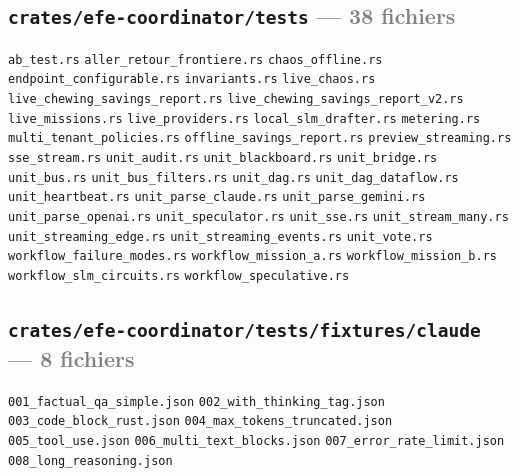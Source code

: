 \documentclass[10pt]{report}
\newcommand{\code}[1]{\texttt{\small #1}}
\begin{document}
\subsection*{\code{crates/efe-coordinator/tests} \normalfont\textcolor{grey}{--- 38 fichiers}}
\begin{sloppypar}\footnotesize\raggedright
\code{ab\_test.rs} \;\textbullet\; \code{aller\_retour\_frontiere.rs} \;\textbullet\; \code{chaos\_offline.rs} \;\textbullet\; \code{endpoint\_configurable.rs} \;\textbullet\; \code{invariants.rs} \;\textbullet\; \code{live\_chaos.rs} \;\textbullet\; \code{live\_chewing\_savings\_report.rs} \;\textbullet\; \code{live\_chewing\_savings\_report\_v2.rs} \;\textbullet\; \code{live\_missions.rs} \;\textbullet\; \code{live\_providers.rs} \;\textbullet\; \code{local\_slm\_drafter.rs} \;\textbullet\; \code{metering.rs} \;\textbullet\; \code{multi\_tenant\_policies.rs} \;\textbullet\; \code{offline\_savings\_report.rs} \;\textbullet\; \code{preview\_streaming.rs} \;\textbullet\; \code{sse\_stream.rs} \;\textbullet\; \code{unit\_audit.rs} \;\textbullet\; \code{unit\_blackboard.rs} \;\textbullet\; \code{unit\_bridge.rs} \;\textbullet\; \code{unit\_bus.rs} \;\textbullet\; \code{unit\_bus\_filters.rs} \;\textbullet\; \code{unit\_dag.rs} \;\textbullet\; \code{unit\_dag\_dataflow.rs} \;\textbullet\; \code{unit\_heartbeat.rs} \;\textbullet\; \code{unit\_parse\_claude.rs} \;\textbullet\; \code{unit\_parse\_gemini.rs} \;\textbullet\; \code{unit\_parse\_openai.rs} \;\textbullet\; \code{unit\_speculator.rs} \;\textbullet\; \code{unit\_sse.rs} \;\textbullet\; \code{unit\_stream\_many.rs} \;\textbullet\; \code{unit\_streaming\_edge.rs} \;\textbullet\; \code{unit\_streaming\_events.rs} \;\textbullet\; \code{unit\_vote.rs} \;\textbullet\; \code{workflow\_failure\_modes.rs} \;\textbullet\; \code{workflow\_mission\_a.rs} \;\textbullet\; \code{workflow\_mission\_b.rs} \;\textbullet\; \code{workflow\_slm\_circuits.rs} \;\textbullet\; \code{workflow\_speculative.rs}
\end{sloppypar}

\subsection*{\code{crates/efe-coordinator/tests/fixtures/claude} \normalfont\textcolor{grey}{--- 8 fichiers}}
\begin{sloppypar}\footnotesize\raggedright
\code{001\_factual\_qa\_simple.json} \;\textbullet\; \code{002\_with\_thinking\_tag.json} \;\textbullet\; \code{003\_code\_block\_rust.json} \;\textbullet\; \code{004\_max\_tokens\_truncated.json} \;\textbullet\; \code{005\_tool\_use.json} \;\textbullet\; \code{006\_multi\_text\_blocks.json} \;\textbullet\; \code{007\_error\_rate\_limit.json} \;\textbullet\; \code{008\_long\_reasoning.json}
\end{sloppypar}
\end{document}
